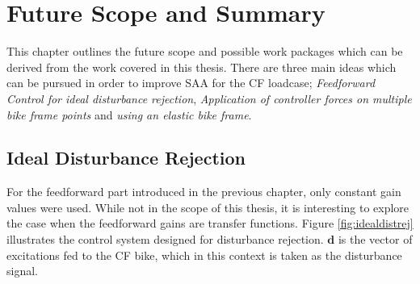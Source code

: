 \changefontsizes{20pt}
\chapter{Future Scope and Summary}
\label{cha:chap6}
\changefontsizes{12pt}
This chapter outlines the future scope and possible work packages which can be derived from the work covered in this thesis. There are three main ideas which can be pursued in order to improve SAA for the CF loadcase; \emph{Feedforward Control for ideal disturbance rejection}, \emph{Application of controller forces on multiple bike frame points} and \emph{using an elastic bike frame}.

\section{Ideal Disturbance Rejection}
For the feedforward part introduced in the previous chapter, only constant gain values were used. While not in the scope of this thesis, it is interesting to explore the case when the feedforward gains are transfer functions.
Figure \ref{fig:idealdistrej} illustrates the control system designed for disturbance rejection. $\mathbf{d}$ is the vector of excitations fed to the CF bike, which in this context is taken as the disturbance signal.
